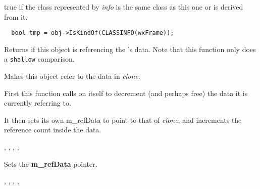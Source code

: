 true if the class represented by {\it info} is the same class as
this one or is derived from it.


\begin{verbatim}
  bool tmp = obj->IsKindOf(CLASSINFO(wxFrame));
\end{verbatim}

\label{wxobjectisrefto}


Returns \true if this object is referencing the 's data.
Note that this function only does a {\tt shallow} comparison.

\label{wxobjectref}


Makes this object refer to the data in {\it clone}.




First this function calls  on itself
to decrement (and perhaps free) the data it is currently referring to.

It then sets its own m\_refData to point to that of {\it clone}, and increments the reference count
inside the data.


, ,\rtfsp
{}, ,\rtfsp
{}

\label{wxobjectsetrefdata}


Sets the {\bf m\_refData} pointer.


, , ,\rtfsp
{},\rtfsp
{}

\label{wxobjectunref}

